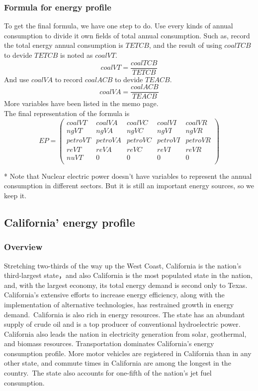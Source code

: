 \documentclass{mcmthesis}
\begin{document}
\subsubsection{Formula for energy profile}
To get the final formula, we have one step to do. Use every kinds of annual consumption to divide it own fields of total annual consumption.
Such as, record the total energy annual consumption is $TETCB$, and the result of using $coalTCB$ to devide $TETCB$ is noted as $coalVT$.
$$coalVT = \frac{coalTCB}{TETCB}$$
And use $coalVA$ to record $coalACB$ to devide $TEACB$.
$$coalVA = \frac{coalACB}{TEACB}$$
More variables have been listed in the memo page.\\
The final representation of the formula is
$$
  EP =
  \begin{pmatrix}
  coalVT & coalVA & coalVC & coalVI & coalVR  \\
  ngVT & ngVA & ngVC & ngVI & ngVR \\
  petroVT &　petroVA & petroVC & petroVI & petroVR \\
  reVT & reVA & reVC & reVI & reVR \\
  nuVT & 0 & 0 & 0 & 0\\
  \end{pmatrix}
$$

* Note that Nuclear electric power doesn't have variables to represent the annual consumption in different sectors.
But it is still an important energy sources, so we keep it.
\subsection{California' energy profile}
\subsubsection{Overview}
Stretching two-thirds of the way up the West Coast, California is the nation's third-largest state，and also California is the most populated state in the nation, and, with the largest economy, its total energy demand is second only to Texas. California's extensive efforts to increase energy efficiency, along with the implementation of alternative technologies, has restrained growth in energy demand. California is also rich in energy resources. The state has an abundant supply of crude oil and is a top producer of conventional hydroelectric power. California also leads the nation in electricity generation from solar, geothermal, and biomass resources. Transportation dominates California's energy consumption profile. More motor vehicles are registered in California than in any other state, and commute times in California are among the longest in the country. The state also accounts for one-fifth of the nation's jet fuel consumption.
\end{document}
